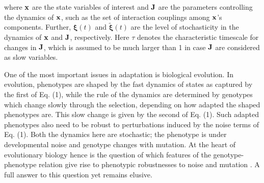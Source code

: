 \documentclass[%
 reprint,
superscriptaddress,
 amsmath,amssymb,
 prl,
]{revtex4-2}
\begin{document}
where $\bold{x}$ are the state variables of interest and $\bold{J}$ are the parameters controlling the dynamics of $\bold{x}$, such as the set of interaction couplings among $\bold{x}$'s components. Further, $\boldsymbol{\xi}(t)$ and $\boldsymbol{\tilde{\xi}}(t)$ are the level of stochasticity in the dynamics of $\bold{x}$ and $\bold{J}$, respectively. Here $\tau$ denotes the characteristic timescale for changes in $\bold{J}$, which is assumed to be much larger than 1 in case $\bold{J}$ are considered as slow variables.

One of the most important issues in adaptation is biological
evolution. In evolution, phenotypes are shaped by the fast dynamics of
states as  captured by the first of Eq. (1), while  the rule of the
dynamics are determined by genotypes which change slowly through the
selection, depending on how  adapted the shaped phenotypes are. This
slow change is given by the second of Eq. (1). Such adapted
phenotypes also need to be robust to perturbations induced by the
noise terms of Eq. (1). Both the dynamics here are stochastic; the phenotype is under developmental noise \cite{Elowitz, Karn,PAULSSON, Eldar2010, Felix, Furusawa2005, KanekoPloSOne2007} and genotype changes with mutation.
At the heart of evolutionary biology hence is the question of which %
features of  the genotype-phenotype relation  give rise to
phenotypic robustnesses to noise and  mutation   \cite{Pham2022,Bressloff_2017, Nichol}. A full answer to this question yet remains elusive.
\end{document}

